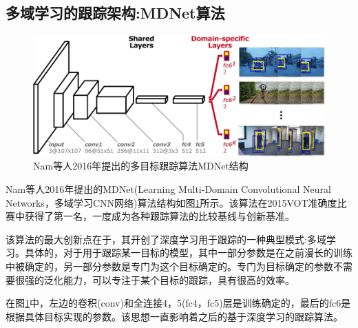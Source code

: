 \subsection{多域学习的跟踪架构:MDNet算法}
\par
\begin{figure}[htbp!]
    \centering
    \includegraphics[width = 1.\textwidth]{chap/img/mdnet_.png}
    \caption{Nam等人2016年提出的多目标跟踪算法MDNet结构\supercite{nam2016mdnet}}
    \label{fig:mdnet_arch}
\end{figure}
\par
Nam等人2016年提出的MDNet(Learning Multi-Domain Convolutional Neural Networks，多域学习CNN网络)算法结构如图\ref{fig:mdnet_arch}所示。该算法在2015VOT准确度比赛中获得了第一名，一度成为各种跟踪算法的比较基线与创新基准。
\par
该算法的最大创新点在于，其开创了深度学习用于跟踪的一种典型模式:多域学习。具体的，对于用于跟踪某一目标的模型，其中一部分参数是在之前漫长的训练中被确定的，另一部分参数是专门为这个目标确定的。专门为目标确定的参数不需要很强的泛化能力，可以专注于某个目标的跟踪，具有很高的效率。
\par
在图\ref{fig:mdnet_arch}中，左边的卷积(conv)和全连接4，5(fc4，fc5)层是训练确定的，最后的fc6是根据具体目标实现的参数。该思想一直影响着之后的基于深度学习的跟踪算法。
\par

